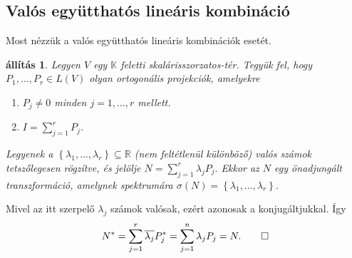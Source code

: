 \documentclass[9pt, a4paper, showtrims]{memoir}
\makeatletter
\renewenvironment{proof}[1][\proofname]
    {\par\pushQED{\qed}%
    \normalfont \topsep6\p@\@plus6\p@\relax
    \trivlist
    \item[\hskip\labelsep
        \itshape
    #1\@addpunct{:}]\ignorespaces}
    {\popQED\endtrivlist\@endpefalse}
\theoremstyle{plain}
\newtheorem{proposition}{állítás}[chapter]
\theoremstyle{remark}
\theoremstyle{definition}
\makeatother
\begin{document}
\subsection{Valós együtthatós lineáris kombináció}
Most nézzük a valós együtthatós lineáris kombinációk esetét.
\begin{proposition}\label{pr:normlinkombvalos}
    Legyen $V$ egy $\mathbb{K}$ feletti skalárisszorzatos-tér.
    Tegyük fel, hogy $P_1,\dots,P_r\in L\left( V \right)$ olyan ortogonális projekciók,
    amelyekre
    \begin{enumerate}
        \item $P_j\neq 0$ minden $j=1,\dots,r$ mellett.
        \item $I=\sum_{j=1}^rP_j$.
    \end{enumerate}
    Legyenek a $\left\{ \lambda_1,\dots,\lambda_r \right\}\subseteq \mathbb{R}$
    (nem feltétlenül különböző) valós számok tetszőlegesen rögzítve, 
    és jelölje
    \(
        N
        =
        \sum_{j=1}^r\lambda_jP_j.
    \)
    Ekkor az $N$ egy \emph{önadjungált} transzformáció, 
    amelynek spektrumára $\sigma\left( N \right)=\left\{ \lambda_1,\dots,\lambda_r \right\}$.
\end{proposition}
\begin{proof}
    Mivel az itt szerpelő $\lambda_j$ számok valósak,
    ezért azonosak a konjugáltjukkal.
    Így
    \begin{displaymath}
        N^\ast=
        \sum_{j=1}^r\overline{\lambda_j}P_j^\ast
        =
        \sum_{j=1}^n\lambda_jP_j
        =N.
        \qedhere
    \end{displaymath}
\end{proof}
\end{document}
